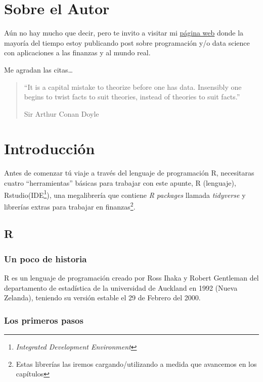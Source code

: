\documentclass[12pt,]{book}
\begin{document}
\chapter*{Sobre el Autor}\label{sobre-el-autor}


Aún no hay mucho que decir, pero te invito a visitar mi \href{}{página
web} donde la mayoría del tiempo estoy publicando post sobre
programación y/o data science con aplicaciones a las finanzas y al mundo
real.

Me agradan las citas\ldots{}

\begin{quote}
``It is a capital mistake to theorize before one has data. Insensibly
one begins to twist facts to suit theories, instead of theories to suit
facts.''

Sir Arthur Conan Doyle
\end{quote}

\chapter{Introducción}\label{intro}

Antes de comenzar tú viaje a través del lenguaje de programación R,
necesitaras cuatro ``herramientas'' básicas para trabajar con este
apunte, R (lenguaje), Rstudio(IDE\footnote{\emph{Integrated Development
  Environment}}), una megalibrería que contiene \emph{R packages}
llamada \emph{tidyverse} y librerías extras para trabajar en
finanzas\footnote{Estas librerías las iremos cargando/utilizando a
  medida que avancemos en los capítulos}.

\section{R}\label{r}

\subsection{Un poco de historia}\label{un-poco-de-historia}

R es un lenguaje de programación creado por Ross Ihaka y Robert
Gentleman del departamento de estadística de la universidad de Auckland
en 1992 (Nueva Zelanda), teniendo su versión estable el 29 de Febrero
del 2000.

\subsection{Los primeros pasos}\label{los-primeros-pasos}
\end{document}
